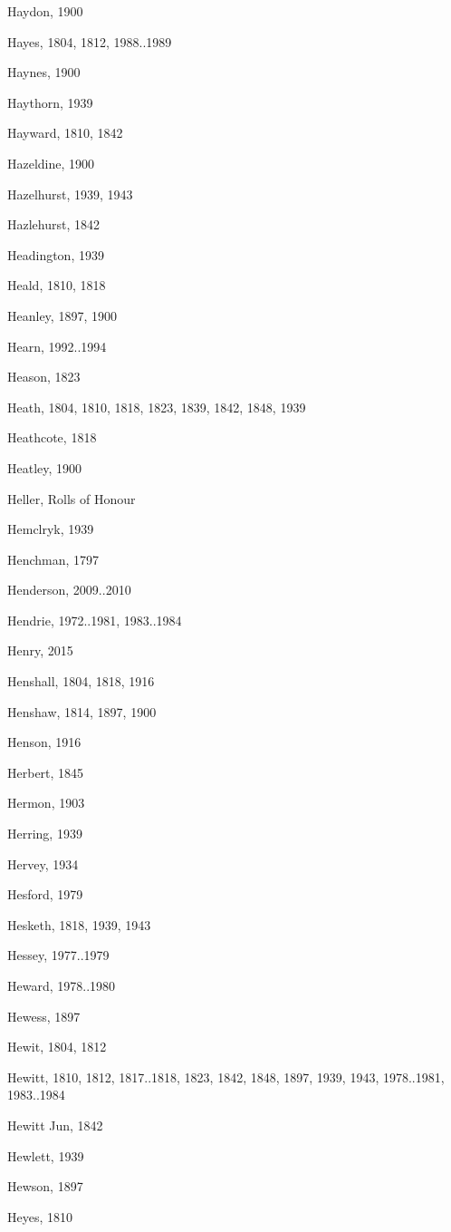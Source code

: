\begin{theindex}
\item Haydon, 1900
\item Hayes, 1804, 1812, 1988..1989
\item Haynes, 1900
\item Haythorn, 1939
\item Hayward, 1810, 1842
\item Hazeldine, 1900
\item Hazelhurst, 1939, 1943
\item Hazlehurst, 1842
\item Headington, 1939
\item Heald, 1810, 1818
\item Heanley, 1897, 1900
\item Hearn, 1992..1994
\item Heason, 1823
\item Heath, 1804, 1810, 1818, 1823, 1839, 1842, 1848, 1939
\item Heathcote, 1818
\item Heatley, 1900
\item Heller, Rolls of Honour
\item Hemclryk, 1939
\item Henchman, 1797
\item Henderson, 2009..2010
\item Hendrie, 1972..1981, 1983..1984
\item Henry, 2015
\item Henshall, 1804, 1818, 1916
\item Henshaw, 1814, 1897, 1900
\item Henson, 1916
\item Herbert, 1845
\item Hermon, 1903
\item Herring, 1939
\item Hervey, 1934
\item Hesford, 1979
\item Hesketh, 1818, 1939, 1943
\item Hessey, 1977..1979
\item Heward, 1978..1980
\item Hewess, 1897
\item Hewit, 1804, 1812
\item Hewitt, 1810, 1812, 1817..1818, 1823, 1842, 1848, 1897, 1939, 1943, 1978..1981, 1983..1984
\item Hewitt Jun, 1842
\item Hewlett, 1939
\item Hewson, 1897
\item Heyes, 1810

\end{theindex}
